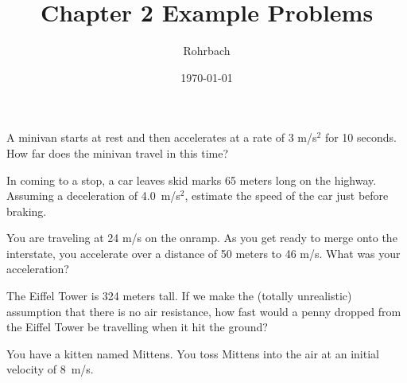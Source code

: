 \documentclass[10pt]{exam}
\title{Chapter 2 Example Problems}
\author{Rohrbach}
\date{\today}
\begin{document}
\maketitle

\def\mystrut{\protect\rule[-2.2ex]{0ex}{2.2ex}} 
\qformat{ \textbf{Example Problem 3-\thequestion}
  \ifthenelse{\equal{\thequestion}{\thequestiontitle}}
    {}
    {: \emph{\thequestiontitle}}
  \mystrut  \hfill}
\begin{questions}
  
  A minivan starts at rest and then accelerates at a rate of 3 m/s$^2$ for 10 seconds.  How far does the minivan travel in this time?
  \vs 

\question
  In coming to a stop, a car leaves skid marks 65 meters long on the highway.  Assuming a deceleration of 4.0~m/s$^2$, estimate the speed of the car just before braking. 
  \vs 

\question
  You are traveling at 24 m/s on the onramp.  As you get ready to merge onto the interstate, you accelerate over a distance of 50 meters to 46 m/s.  What was your acceleration?
  \vs 

\pagebreak

  The Eiffel Tower is 324 meters tall.  If we make the (totally unrealistic) assumption that there is no air resistance, how fast would a penny dropped from the Eiffel Tower be travelling when it hit the ground?
  \vs 


  You have a kitten named Mittens.  You toss Mittens into the air at an initial velocity of 8~m/s. 
  
  \vs
  



\end{questions}
\end{document}

